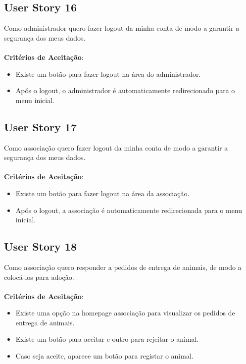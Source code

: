\documentclass[a4paper,11pt]{article}
\begin{document}
\subsection*{User Story 16}
Como administrador quero fazer logout da minha conta de modo a garantir a segurança dos meus dados.\\\\
\textbf{Critérios de Aceitação}:
\begin{itemize}
  \item Existe um botão para fazer logout na área do administrador.
  \item Após o logout, o administrador é automaticamente redirecionado para o menu inicial.
\end{itemize}

\subsection{User Story 17}
Como associação quero fazer logout da minha conta de modo a garantir a segurança dos meus dados.\\\\
\textbf{Critérios de Aceitação}:
\begin{itemize}
  \item Existe um botão para fazer logout na área da associação.
  \item Após o logout, a associação é automaticamente redirecionada para o menu inicial.
\end{itemize}

\subsection*{User Story 18}
Como associação quero responder a pedidos de entrega de animais, de modo a colocá-los para adoção.\\\\
\textbf{Critérios de Aceitação}:
\begin{itemize}
  \item Existe uma opção na homepage associação para visualizar os pedidos de entrega de animais.
  \item Existe um botão para aceitar e outro para rejeitar o animal.
  \item Caso seja aceite, aparece um botão para registar o animal.
\end{itemize}
\end{document}
